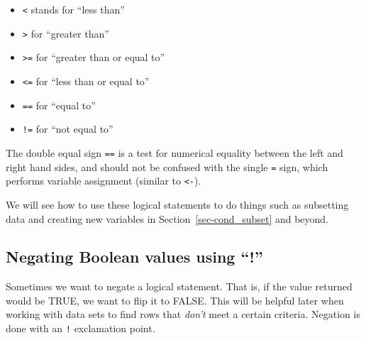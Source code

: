 \documentclass[
  letterpaper,
  DIV=11,
  numbers=noendperiod,
  oneside]{scrreprt}
\providecommand{\tightlist}{%
  \setlength{\itemsep}{0pt}\setlength{\parskip}{0pt}}\usepackage{longtable,booktabs,array}
\begin{document}
\begin{tcolorbox}[enhanced jigsaw, bottomrule=.15mm, colback=white, colframe=quarto-callout-note-color-frame, toprule=.15mm, coltitle=black, rightrule=.15mm, opacitybacktitle=0.6, colbacktitle=quarto-callout-note-color!10!white, toptitle=1mm, leftrule=.75mm, breakable, bottomtitle=1mm, titlerule=0mm, title=\textcolor{quarto-callout-note-color}{\faInfo}\hspace{0.5em}{Comparison Symbols}, arc=.35mm, left=2mm, opacityback=0]

\begin{itemize}
\tightlist
\item
  \texttt{\textless{}} stands for ``less than''
\item
  \texttt{\textgreater{}} for ``greater than''
\item
  \texttt{\textgreater{}=} for ``greater than or equal to''
\end{itemize}

\begin{itemize}
\tightlist
\item
  \texttt{\textless{}=} for ``less than or equal to''
\item
  \texttt{==} for ``equal to''
\item
  \texttt{!=} for ``not equal to''
\end{itemize}

The double equal sign \texttt{==} is a test for numerical equality
between the left and right hand sides, and should not be confused with
the single \texttt{=} sign, which performs variable assignment (similar
to \texttt{\textless{}-}).

\end{tcolorbox}

We will see how to use these logical statements to do things such as
subsetting data and creating new variables in
Section~\ref{sec-cond_subset} and beyond.

\subsection{Negating Boolean values using
``!''}\label{negating-boolean-values-using}

Sometimes we want to negate a logical statement. That is, if the value
returned would be TRUE, we want to flip it to FALSE. This will be
helpful later when working with data sets to find rows that \emph{don't}
meet a certain criteria. Negation is done with an \texttt{!} exclamation
point.
\end{document}
